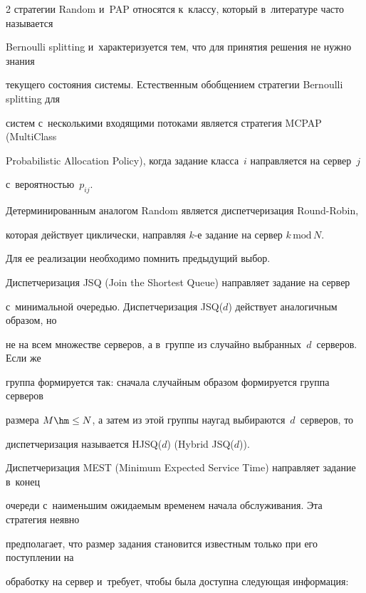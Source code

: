 \begin{multicols}{2}
стратегии Random и~PAP относятся к~классу, который в~литературе часто называется 


Bernoulli splitting и~характеризуется тем, что для принятия решения не нужно знания 


текущего состояния системы. Естественным обобщением стратегии Bernoulli splitting для 


систем с~несколькими входящими потоками является стратегия MCPAP (MultiClass 


Probabilistic Allocation Policy), когда задание класса~$i$ направляется на сервер~$j$ 


с~вероятностью~$p_{ij}$.


    


    Детерминированным аналогом Random является диспетчеризация Round-Robin, 


которая действует циклически, направляя $k$-е задание на сервер $k\,\mathrm{mod}\,N$. 


Для ее реализации необходимо помнить предыдущий выбор.


    


    Диспетчеризация JSQ (Join the Shortest Queue) направляет задание на сервер 


    с~минимальной очередью. Диспетчеризация JSQ($d$) действует аналогичным образом, но 


не на всем множестве серверов, а в~группе из случайно выбранных~$d$~серверов. Если же 


группа формируется так: сначала случайным образом формируется группа серверов 


размера $M\hm\leq N$, а затем из этой группы наугад выбираются~$d$~серверов, то 


диспетчеризация называется HJSQ($d$) (Hybrid JSQ($d$)).


    


    Диспетчеризация MEST (Minimum Expected Service Time) направляет задание в~конец 


очереди с~наименьшим ожидаемым временем начала обслуживания. Эта стратегия неявно 


предполагает, что размер задания становится известным только при его поступлении на 


обработку на сервер и~требует, чтобы была доступна следующая информация:


    \begin{itemize}



\end{itemize}
\end{multicols}

